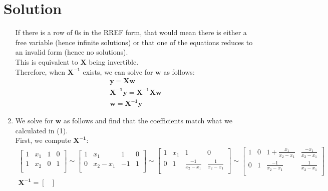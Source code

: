 \documentclass{harvardml}
\theoremstyle{definition}
\theoremstyle{plain}
\newenvironment{solution}
  {\color{blue}\section*{Solution}}
{}
\begin{document}
\begin{solution}
\begin{enumerate}
        If there is a row of 0s in the RREF form, that would mean there is either a free variable (hence infinite solutions) or that one of the equations reduces to an invalid form (hence no solutions). \\
        This is equivalent to $\mathbf{X}$ being invertible.\\
        Therefore, when $\mathbf{X^{-1}}$ exists, we can solve for $\mathbf{w}$ as follows:\\
        \begin{align*}
            \mathbf{y} = \mathbf{X}\mathbf{w}\\
            \mathbf{X^{-1}}\mathbf{y} = \mathbf{X^{-1}}\mathbf{X}\mathbf{w}\\
            \mathbf{w} = \mathbf{X^{-1}}\mathbf{y}
        \end{align*}
        \item We solve for $\mathbf{w}$ as follows and find that the coefficients match what we calculated in (1). \\
        First, we compute $\mathbf{X^{-1}}$:
        \begin{align*}
        \left[
            \begin{array}{cc|cc}
                1 & x_1 & 1 & 0 \\
                1 & x_2 & 0 & 1 \\
            \end{array}
        \right] \sim \left[
            \begin{array}{cc|cc}
                1 & x_1 & 1 & 0 \\
                0 & x_2 - x_1 & -1 & 1 \\
            \end{array}
        \right] \sim \left[
            \begin{array}{cc|cc}
                1 & x_1 & 1 & 0 \\
                0 & 1 & \frac{-1}{x_2-x_1} & \frac{1}{x_2-x_1} \\
            \end{array}
        \right] \sim \left[
            \begin{array}{cc|cc}
                1 & 0 & 1 + \frac{x_1}{x_2-x_1} & \frac{-x_1}{x_2-x_1} \\
                0 & 1 & \frac{-1}{x_2-x_1} & \frac{1}{x_2-x_1} \\
            \end{array}
        \right]\\
        \mathbf{X^{-1}} = \begin{bmatrix}

\end{bmatrix}
\end{align*}
\end{enumerate}
\end{solution}
\end{document}
